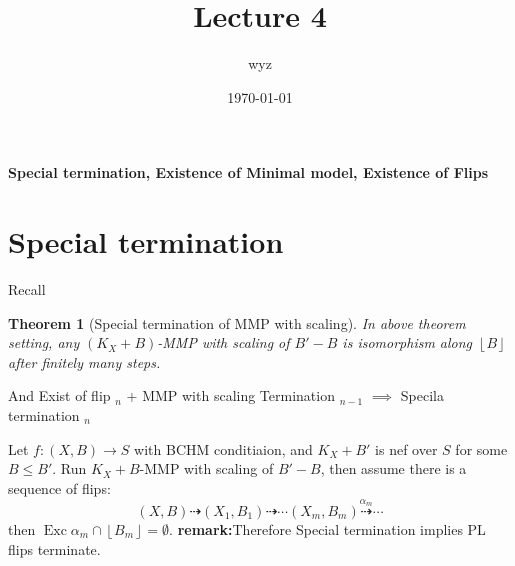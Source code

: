 \documentclass{article}
\title{Lecture 4}
\author{wyz}
\date{\today}
\newtheorem{thm}[defn]{Theorem}
\begin{document}
  \maketitle
  \textbf{Special termination, Existence of Minimal model, Existence of Flips}
\section{Special termination}
Recall

\begin{thm}[Special termination of MMP with scaling]
  In above theorem setting, any $(K_{X}+B)$-MMP with scaling of  $B'-B$ is isomorphism along  $\left\lfloor B \right\rfloor $ after finitely many steps.
\end{thm}
  And  Exist of flip $_n$ + MMP with scaling Termination $_{n-1}$ $\implies$ Specila termination $_n$ 

Let $f:(X,B)\to S$ with BCHM conditiaion, and  $K_{X}+B'$ is nef over  $S$ for some $B\leqslant B'$. Run $K_{X}+B$-MMP with scaling of $B'-B$, then assume there is a sequence of flips:
\[
  (X,B)\dashrightarrow (X_{1},B_{1}) \dashrightarrow \cdots (X_{m},B_{m})  \overset{\alpha_{m}}{\dashrightarrow } \cdots
\]
then $\operatorname{Exc}\alpha_{m} \cap \left\lfloor B_{m} \right\rfloor = \emptyset$.
\textbf{remark:}Therefore Special termination implies PL flips terminate.
\end{document}
